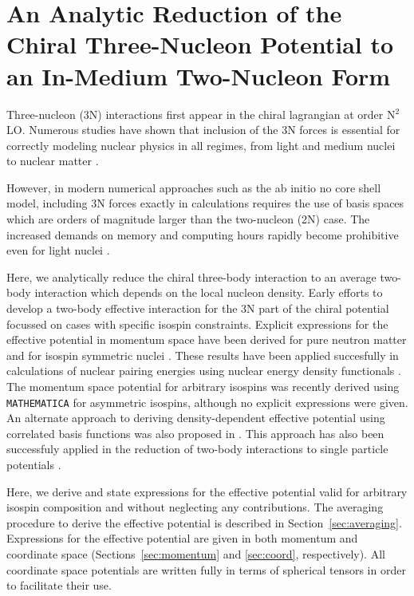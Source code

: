 
\chapter{\label{chap:3to2}An Analytic Reduction of the Chiral Three-Nucleon Potential to an In-Medium Two-Nucleon Form}

Three-nucleon (3N) interactions first appear in the chiral lagrangian at order N$^2$LO. Numerous studies have shown that inclusion of the 3N forces is essential for correctly modeling nuclear physics in all regimes, from light and medium nuclei \cite{PhysRevLett.99.042501,0954-3899-39-8-085111} to nuclear matter \cite{PhysRevC.82.014314,PhysRevC.83.031301}.

However, in modern numerical approaches such as the ab initio no core shell model, including 3N forces exactly in calculations requires the use of basis spaces which are orders of magnitude larger than the two-nucleon (2N) case. The increased demands on memory and computing hours rapidly become prohibitive even for light nuclei \cite{Barrett2013131}. 

Here, we analytically reduce the chiral three-body interaction to an average two-body interaction which depends on the local nucleon density. Early efforts to develop a two-body effective interaction for the 3N part of the chiral potential focussed  on cases with specific isospin constraints. Explicit expressions for  the effective potential in momentum space have been derived for pure neutron matter \cite{PhysRevC.82.014314} and for isospin symmetric nuclei \cite{PhysRevC.81.024002}. These results have been applied succesfully in calculations of nuclear pairing energies using nuclear energy density functionals \cite{0954-3899-39-1-015108}. The momentum space potential for arbitrary isospins was recently derived using \texttt{MATHEMATICA} for asymmetric isospins, although no explicit expressions were given\cite{Drischler:2015eba}. An alternate approach to deriving density-dependent effective potential using correlated basis functions was also proposed in \cite{PhysRevC.83.054003}. This approach has also been successfuly applied in the reduction of two-body interactions to single particle potentials \cite{PhysRev.133.B329,AdelbergerHaxton}. 

Here, we derive and state expressions for the effective potential valid for arbitrary isospin composition and without neglecting any contributions. The averaging procedure to derive the effective potential is described in Section~\ref{sec:averaging}. Expressions for the effective potential are given in both momentum and coordinate space (Sections~\ref{sec:momentum} and \ref{sec:coord}, respectively). All coordinate space potentials are written fully in terms of spherical tensors in order to facilitate their use. 

